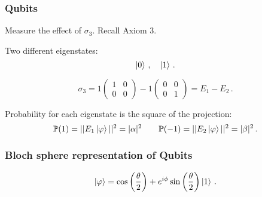 \documentclass[12pt]{beamer}
\begin{document}
\begin{frame}
    \frametitle{Qubits}
    Measure the effect of $\sigma_3$. Recall Axiom 3. 

    Two different eigenstates:
    \begin{equation*}
        \ket{0} \,, \quad \ket{1} \,.
    \end{equation*}

    \begin{equation*}
        \sigma_3 = 1 \begin{pmatrix}
            1 & 0 \\  0 & 0
        \end{pmatrix} -1  \begin{pmatrix}
            0 & 0 \\  0 & 1
        \end{pmatrix} = E_1 - E_2 \,.
    \end{equation*}

    Probability for each eigenstate is the square of the projection:
    \begin{equation*}
        \mathbb{P}(1) = || E_1 \ket{\varphi}||^2 = |\alpha|^2 \qquad
        \mathbb{P}(-1) = || E_2 \ket{\varphi}||^2 = |\beta|^2 \,.
    \end{equation*}

\end{frame}


\begin{frame}
    \frametitle{Bloch sphere representation of Qubits}
    \begin{theorem}
        \begin{equation*}
            \ket{\varphi} = \cos \left( \frac{\theta}{2} \right) + e^{i\phi} \sin \left( \frac{\theta}{2}  \right) \ket{1} \,.
        \end{equation*}
    \end{theorem}


\end{frame}

\printbibliography 
%
%
\end{document}
